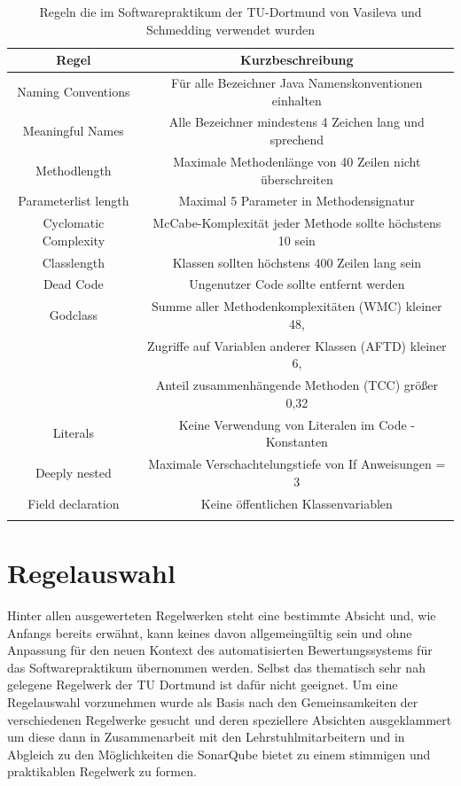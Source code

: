 \documentclass[da,ngerman]{stthesis}
\begin{document}
				\begin{center}
					\tabulinesep=1.5mm
					\begin{longtabu}{|c|c|}
						\hline
  						\textbf{Regel} & \textbf{Kurzbeschreibung}\\
  						\hline
  						Naming Conventions & Für alle Bezeichner Java Namenskonventionen einhalten \\
  						\hline
						Meaningful Names & Alle Bezeichner mindestens 4 Zeichen lang und sprechend \\
						\hline
						Methodlength & Maximale Methodenlänge von 40 Zeilen nicht überschreiten \\
						\hline
						Parameterlist length & Maximal 5 Parameter in Methodensignatur \\
						\hline
						Cyclomatic Complexity & McCabe-Komplexität jeder Methode sollte höchstens 10 sein \\
						\hline
						Classlength & Klassen sollten höchstens 400 Zeilen lang sein \\
						\hline
						Dead Code & Ungenutzer Code sollte entfernt werden \\
						\hline
						Godclass  & Summe aller Methodenkomplexitäten (WMC) kleiner 48, \\ & Zugriffe auf Variablen anderer Klassen (AFTD) kleiner 6, \\ & Anteil zusammenhängende Methoden (TCC) größer 0,32 \\
						\hline
						Literals & Keine Verwendung von Literalen im Code - Konstanten \\
						\hline
						Deeply nested & Maximale Verschachtelungstiefe von If Anweisungen = 3 \\
						\hline
						Field declaration & Keine öffentlichen Klassenvariablen \\
  						\hline
  						\caption{Regeln die im Softwarepraktikum der TU-Dortmund von Vasileva und Schmedding verwendet wurden \cite{ImproveCodeQuality}}
						\label{soprarules}
  					\end{longtabu}   
  				\end{center}
		\section{Regelauswahl}
			Hinter allen ausgewerteten Regelwerken steht eine bestimmte Absicht und, wie Anfangs bereits erwähnt, kann keines davon allgemeingültig sein und ohne Anpassung für den neuen Kontext des automatisierten Bewertungssystems für das Softwarepraktikum übernommen werden. Selbst das thematisch sehr nah gelegene Regelwerk der TU Dortmund ist dafür nicht geeignet. Um eine Regelauswahl vorzunehmen wurde als Basis nach den Gemeinsamkeiten der verschiedenen Regelwerke gesucht und deren speziellere Absichten ausgeklammert um diese dann in Zusammenarbeit mit den Lehrstuhlmitarbeitern und in Abgleich zu den Möglichkeiten die SonarQube bietet zu einem stimmigen und praktikablen Regelwerk zu formen.
\end{document}
